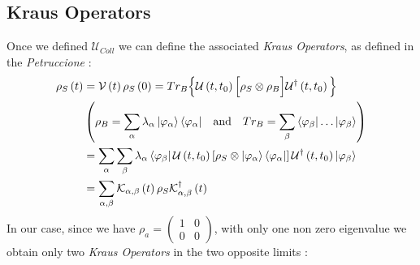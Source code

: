 \documentclass[a4paper,12pt]{article}
\begin{document}
	\subsection{Kraus Operators}
	Once we defined $ \mathcal{U}_{Coll} $ we can define the associated \textit{Kraus Operators}, as defined in the \textit{Petruccione} :
	\begin{align}
		\rho_{S} \left(t\right) &= \mathcal{V}\left(t\right) \rho_{S} \left(0\right) = Tr_{B} \Big\{ \mathcal{U}\left(t, t_0\right) \Big[ \rho_{S} \otimes \rho_{B} \Big] \mathcal{U}^{\dagger}\left(t, t_0\right) \Big\} \\
		&\left( \rho_{B} = \sum_{\alpha}{\lambda_{\alpha} \ket{\varphi_{\alpha}} \bra{\varphi_{\alpha}}} \quad \text{and} \quad Tr_{B} = \sum_{\beta}{\bra{\varphi_{\beta}} \dots \ket{\varphi_{\beta}}} \right) \notag \\
		&= \sum_{\alpha}{\sum_{\beta}{\lambda_{\alpha}\bra{\varphi_{\beta}} \mathcal{U}\left(t, t_0\right) \left[ \rho_{S} \otimes \ket{\varphi_{\alpha}} \bra{\varphi_{\alpha}} \right]  \mathcal{U}^{\dagger}\left(t, t_0\right) \ket{\varphi_{\beta}} }} \notag \\
		&= \sum_{\alpha, \beta}{ \mathcal{K}_{\alpha, \beta} \left(t\right) \rho_{S} \mathcal{K}^{\dagger}_{\alpha, \beta} \left(t\right) }
		\label{eq:dynamical_map_kraus_operators}
	\end{align}
	In our case, since we have $ \rho_{a} = \begin{pmatrix} 1 & 0 \\ 0 & 0 \end{pmatrix} $, with only one non zero eigenvalue we obtain only two \textit{Kraus Operators} in the two opposite limits : 
\end{document}
